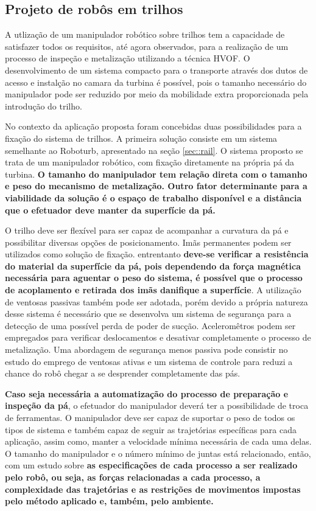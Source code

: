 \subsection{Projeto de robôs em trilhos}\label{proj_rail}
 
A utlização de um manipulador robótico sobre trilhos tem a capacidade de
satisfazer todos os requisitos, até agora observados, para a realização de um
processo de inspeção e metalização utilizando a técnica HVOF. O desenvolvimento
de um sistema compacto para o transporte através dos dutos de acesso e instalção
no camara da turbina é possível, pois o tamanho necessário do manipulador pode
ser reduzido por meio da mobilidade extra proporcionada pela introdução do
trilho.

No contexto da aplicação proposta foram concebidas duas possibilidades para a
fixação do sistema de trilhos. A primeira solução consiste em um sistema
semelhante ao Roboturb, apresentado na seção \ref{sec::rail}. O sistema proposto
se trata de um manipulador robótico, com fixação diretamente na própria pá da
turbina. \textbf{O tamanho do manipulador tem relação direta com o tamanho e
peso do mecanismo de metalização. Outro fator determinante para a viabilidade da
solução é o espaço de trabalho disponível e a distância que o efetuador deve
manter da superfície da pá.}

O trilho deve ser flexível para ser capaz de acompanhar a curvatura da pá e
possibilitar diversas opções de posicionamento. Imãs permanentes podem ser
utilizados como solução de fixação. entrentanto \textbf{deve-se verificar a
resistência do material da superfície da pá, pois dependendo da força magnética
necessária para aguentar o peso do sistema, é possível que o processo de
acoplamento e retirada dos imãs danifique a superfície}. A utilização de
ventosas passivas também pode ser adotada, porém devido a própria natureza desse
sistema é necessário que se desenvolva um sistema de segurança para a detecção
de uma possível perda de poder de sucção. Aceleromêtros podem ser empregados
para verificar deslocamentos e desativar completamente o processo de
metalização. Uma abordagem de segurança menos passiva pode consistir no estudo
do emprego de ventosas ativas e um sistema de controle para reduzi a chance do
robô chegar a se desprender completamente das pás.

\textbf{Caso seja necessária a automatização do processo de preparação e
inspeção da pá}, o efetuador do manipulador deverá ter a possibilidade de troca 
de ferramentas. O manipulador deve ser capaz de suportar o peso de todos os
tipos de sistema e também capaz de seguir as trajetórias específicas para cada
aplicação, assim como, manter a velocidade mínima necessária de cada uma delas.
O tamanho do manipulador e o número mínimo de juntas está relacionado, então,
com um estudo sobre \textbf{as especificações de cada processo a ser realizado
pelo robô, ou seja, as forças relacionadas a cada processo, a complexidade das
trajetórias e as restrições de movimentos impostas pelo método aplicado e,
também, pelo ambiente.}

